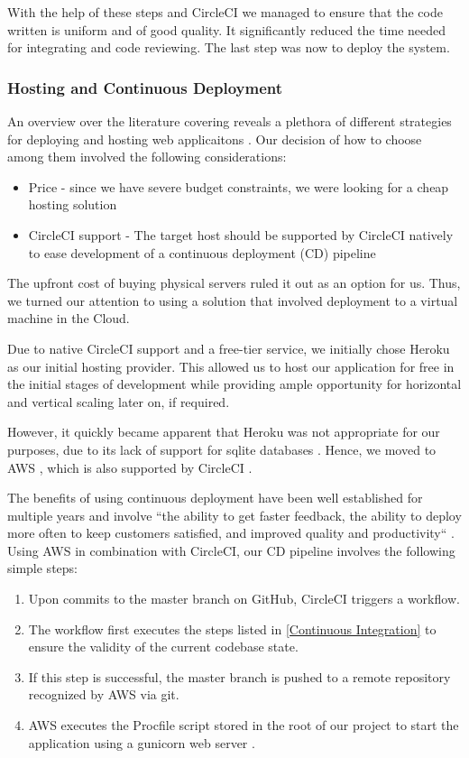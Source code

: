 \documentclass[main.tex]{subfiles}
\begin{document}
With the help of these steps and CircleCI we managed to ensure that the code written is uniform and of good quality. It significantly reduced the time needed for integrating and code reviewing. The last step was now to deploy the system.

\subsubsection{Hosting and Continuous Deployment}
\label{Continuous Deployment}

An overview over the literature covering reveals a plethora of different strategies for deploying and hosting web applicaitons \cite{ConnollyFundamentals}. Our decision of how to choose among them involved the following considerations:

\begin{itemize}
    \item Price - since we have severe budget constraints, we were looking for a cheap hosting solution
    \item CircleCI support - The target host should be supported by CircleCI natively to ease development of a continuous deployment (CD) pipeline
\end{itemize}

The upfront cost of buying physical servers ruled it out as an option for us. Thus, we turned our attention to using a solution that involved deployment to a virtual machine in the Cloud.

Due to native CircleCI support and a free-tier service, we initially chose Heroku \cite{Heroku} as our initial hosting provider. This allowed us to host our application for free in the initial stages of development while providing ample opportunity for horizontal and vertical scaling later on, if required.

However, it quickly became apparent that Heroku was not appropriate for our purposes, due to its lack of support for sqlite databases \cite{HerokuSqlite}. Hence, we moved to AWS \cite{AWS}, which is also supported by CircleCI \cite{AWS}.

The benefits of using continuous deployment have been well established for multiple years and involve ``the ability to get faster feedback, the ability to deploy more often to keep customers satisfied, and improved quality and productivity`` \cite{CDBenefits}. Using AWS in combination with CircleCI, our CD pipeline involves the following simple steps:

\begin{enumerate}
    \item Upon commits to the master branch on GitHub, CircleCI triggers a workflow.
    \item The workflow first executes the steps listed in \ref{Continuous Integration} to ensure the validity of the current codebase state.
    \item If this step is successful, the master branch is pushed to a remote repository recognized by AWS via git.
    \item AWS executes the Procfile script stored in the root of our project to start the application using a gunicorn web server \cite{Gunicorn}.
\end{enumerate}
\end{document}
